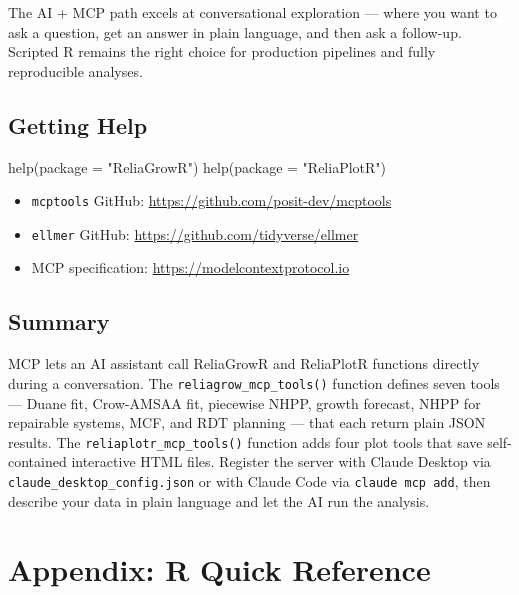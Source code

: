 \documentclass[
  letterpaper,
  DIV=11,
  numbers=noendperiod]{scrreprt}
\newenvironment{Shaded}{\begin{snugshade}}{\end{snugshade}}
\newcommand{\AttributeTok}[1]{\textcolor[rgb]{0.40,0.45,0.13}{#1}}
\newcommand{\FunctionTok}[1]{\textcolor[rgb]{0.28,0.35,0.67}{#1}}
\newcommand{\NormalTok}[1]{\textcolor[rgb]{0.00,0.23,0.31}{#1}}
\newcommand{\StringTok}[1]{\textcolor[rgb]{0.13,0.47,0.30}{#1}}
\providecommand{\tightlist}{%
  \setlength{\itemsep}{0pt}\setlength{\parskip}{0pt}}
\begin{document}
The AI + MCP path excels at conversational exploration --- where you
want to ask a question, get an answer in plain language, and then ask a
follow-up. Scripted R remains the right choice for production pipelines
and fully reproducible analyses.

\section{Getting Help}\label{getting-help-2}

\begin{Shaded}
\begin{Highlighting}[]
\FunctionTok{help}\NormalTok{(}\AttributeTok{package =} \StringTok{"ReliaGrowR"}\NormalTok{)}
\FunctionTok{help}\NormalTok{(}\AttributeTok{package =} \StringTok{"ReliaPlotR"}\NormalTok{)}
\end{Highlighting}
\end{Shaded}

\begin{itemize}
\tightlist
\item
  \texttt{mcptools} GitHub: \url{https://github.com/posit-dev/mcptools}
\item
  \texttt{ellmer} GitHub: \url{https://github.com/tidyverse/ellmer}
\item
  MCP specification: \url{https://modelcontextprotocol.io}
\end{itemize}

\section{Summary}\label{summary-8}

MCP lets an AI assistant call ReliaGrowR and ReliaPlotR functions
directly during a conversation. The \texttt{reliagrow\_mcp\_tools()}
function defines seven tools --- Duane fit, Crow-AMSAA fit, piecewise
NHPP, growth forecast, NHPP for repairable systems, MCF, and RDT
planning --- that each return plain JSON results. The
\texttt{reliaplotr\_mcp\_tools()} function adds four plot tools that
save self-contained interactive HTML files. Register the server with
Claude Desktop via \texttt{claude\_desktop\_config.json} or with Claude
Code via \texttt{claude\ mcp\ add}, then describe your data in plain
language and let the AI run the analysis.


\chapter*{Appendix: R Quick Reference}\label{sec-appendix}
\end{document}
